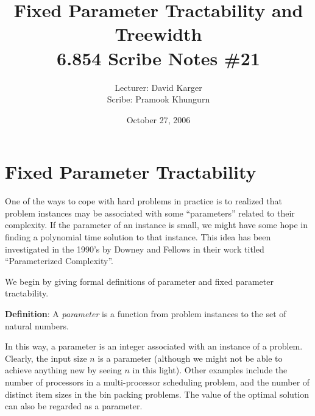 \documentclass{article}
\title{Fixed Parameter Tractability and Treewidth\\ 6.854 Scribe Notes \#21}
\date{October 27, 2006}
\author{Lecturer: David Karger\\ Scribe: Pramook Khungurn}
\begin{document}
%
%
%
%

%



\section{Fixed Parameter Tractability}

One of the ways to cope with hard problems in practice is to realized that problem instances may be associated with 
some ``parameters'' related to their complexity. If the parameter of an instance is small, we might have some hope 
in finding a polynomial time  solution to that instance. This idea has been investigated in the 1990's by 
Downey and Fellows in their work titled ``Parameterized Complexity''.

We begin by giving formal definitions of parameter and fixed parameter tractability.

\textbf{Definition}:
A \emph{parameter} is a function from problem instances to the set of natural numbers.

In this way, a parameter is an integer associated with an instance of a problem. 
Clearly, the input size $n$ is a parameter (although we might not be able to achieve anything new
by seeing $n$ in this light). Other examples include the number of processors in a
multi-processor scheduling problem, and the number of distinct item sizes in the bin packing problems.
The value of the optimal solution can also be regarded as a parameter.
\end{document}
